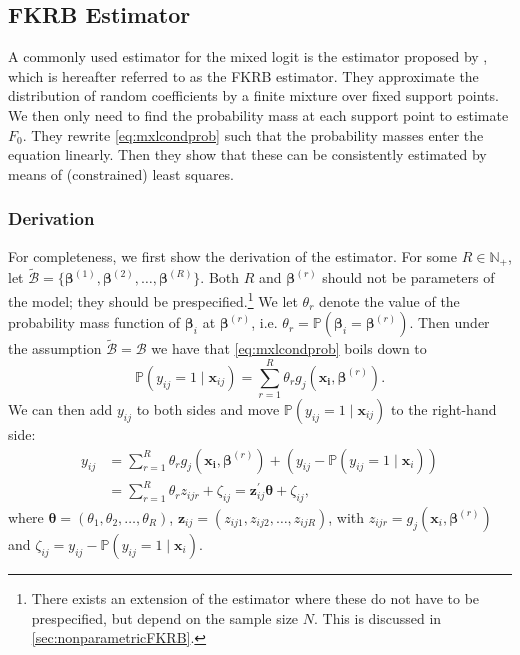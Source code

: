 \subsection{FKRB Estimator}
\label{sec:FKRBestimator}
A commonly used estimator for the mixed logit is the estimator proposed by \citet{FoxKimRyanBajari2011}, which is hereafter referred to as the FKRB estimator.
They approximate the distribution of random coefficients by a finite mixture over fixed support points.
We then only need to find the probability mass at each support point to estimate $F_0$.
They rewrite \cref{eq:mxlcondprob} such that the probability masses enter the equation linearly.
Then they show that these can be consistently estimated by means of (constrained) least squares.

\subsubsection{Derivation}
\label{sec:FKRBderivation}
For completeness, we first show the derivation of the estimator. 
For some $R \in \mathbb{N}_+$, let $\tilde{\mathcal{B}} = \{\bm{\beta}^{(1)}, \bm{\beta}^{(2)}, \ldots, \bm{\beta}^{(R)}\}$.
Both $R$ and $\bm{\beta}^{(r)}$ should not be parameters of the model; they should be prespecified.\footnote{There exists an extension of the estimator where these do not have to be prespecified, but depend on the sample size $N$. This is discussed in \cref{sec:nonparametricFKRB}.} 
We let $\theta_r$ denote the value of the probability mass function of $\bm{\beta}_{i}$ at $\bm{\beta}^{(r)}$, i.e. $\theta_r = \mathbb{P}(\bm{\beta}_{i} = \bm{\beta}^{(r)})$.
Then under the assumption $\tilde{\mathcal{B}} = \mathcal{B}$ we have that \cref{eq:mxlcondprob} boils down to
\begin{equation}
\label{eq:FKRBpij}
    \mathbb{P}(y_{ij} = 1 \mid \bm{x}_{ij}) = \sum_{r = 1}^{R} \theta_r g_j\! \left(\bm{x_i},\bm{\beta}^{(r)}\right).
\end{equation}
We can then add $y_{ij}$ to both sides and move $\mathbb{P}(y_{ij}=1\mid \bm{x}_{ij})$ to the right-hand side:
\begin{align}
\label{eq:FKRBreg}
    y_{ij} &= \sum_{r = 1}^{R} \theta_r g_j\! \left(\bm{x_i},\bm{\beta}^{(r)}\right) + \left(y_{ij} - \mathbb{P}(y_{ij} = 1 \mid \bm{x}_{i})\right) \\
        \label{eq:FKRBzetadef}
        &= \sum_{r = 1}^{R} \theta_r z_{ijr} + \zeta_{ij} = \bm{z}_{ij}^\prime \bm{\theta} + \zeta_{ij},
\end{align}
where $\bm{\theta}=(\theta_1,\theta_2,\ldots,\theta_R)$, $\bm{z}_{ij} = (z_{ij1}, z_{ij2}, \ldots, z_{ijR})$, with $z_{ijr} = g_j(\bm{x}_{i}, \bm{\beta}^{(r)})$ and $\zeta_{ij} = y_{ij} - \mathbb{P}(y_{ij} = 1 \mid \bm{x}_{i})$.
